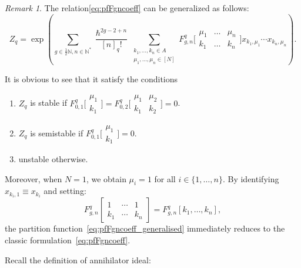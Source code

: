 \documentclass[reqno,11pt]{amsart}
\theoremstyle{plain}
\theoremstyle{definition}
\theoremstyle{remark}
\newtheorem{remark}[theorem]{Remark}
\numberwithin{equation}{section}
\newcommand{\1}{\mathds{1}}
\newcommand{\2}{\frac{1}{2}}
\begin{document}
				{\begin{remark}
						The relation\eqref{eq:pfFgncoeff} can be generalized as follows:\begin{equation}\label{eq:pfFgncoeff_generalised}
							Z_q = \exp\left( \sum_{g \in \frac{1}{2} \mathbb{N}, n \in \mathbb{N}^*} \frac{\hslash^{2g-2+n}}{[n]_q!}  \sum_{\substack{k_1, \ldots, k_n \in A\\ \mu_1,\ldots,\mu_n\in [N]}}  F^{q}_{g,n} \bigg[\begin{array}{ccc} \mu_1 & \ldots &\mu_n \\ k_1 & \ldots & k_n\end{array} \bigg] x_{k_1, \mu_1} \cdots x_{k_n, \mu_n}\right).
						\end{equation}
						
						It is obvious to see that it satisfy the conditions
						\begin{enumerate}
							\item [(i)] $Z_q$ is stable if $F^{q}_{0,1}\bigg[\begin{array}{c} \mu_1 \\ k_1 \end{array} \bigg]=F^{q}_{0,2}\bigg[\begin{array}{cc} \mu_1&\mu_2 \\ k_1&k_2 \end{array} \bigg]=0$.
							\item [(ii)] $Z_q$ is semistable if $F^{q}_{0,1}\bigg[\begin{array}{c} \mu_1 \\ k_1 \end{array} \bigg]=0$.
							\item [(iii)] unstable otherwise.
						\end{enumerate} 
						Moreover,  when $N=1$, we obtain $\mu_i = 1$ for all $i \in \{1, \dots, n\}$. By identifying $x_{k_i, 1} \equiv x_{k_i}$ and setting:
						\begin{equation}
							F^{q}_{g,n} \left[\begin{array}{ccc} 1 & \cdots & 1 \\ k_1 & \cdots & k_n \end{array} \right] = F^{q}_{g,n}[k_1, \dots, k_n],
						\end{equation}
						the partition function~\eqref{eq:pfFgncoeff_generalised} immediately reduces to the classic formulation~\eqref{eq:pfFgncoeff}.
				\end{remark}}
				Recall the definition of annihilator ideal:
				
\end{document}
